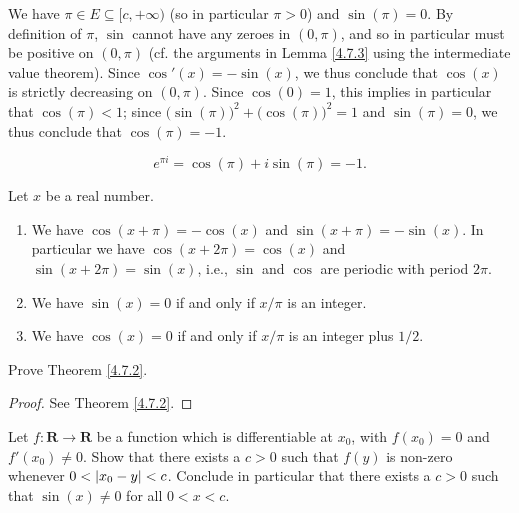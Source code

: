 \begin{additional corollary}\label{ac 4.7.2}
We have \(\pi \in E \subseteq [c, +\infty)\) (so in particular \(\pi > 0\)) and \(\sin(\pi) = 0\).
By definition of \(\pi\), \(\sin\) cannot have any zeroes in \((0, \pi)\), and so in particular must be positive on \((0, \pi)\)
(cf. the arguments in Lemma \ref{4.7.3} using the intermediate value theorem).
Since \(\cos'(x) = -\sin(x)\), we thus conclude that \(\cos(x)\) is strictly decreasing on \((0, \pi)\).
Since \(\cos(0) = 1\), this implies in particular that \(\cos(\pi) < 1\);
since \(\big(\sin(\pi)\big)^2 + \big(\cos(\pi)\big)^2 = 1\) and \(\sin(\pi) = 0\), we thus conclude that \(\cos(\pi) = -1\).
\end{additional corollary}

\begin{additional corollary}\label{ac 4.7.3}
\[
    e^{\pi i} = \cos(\pi) + i \sin(\pi) = -1.
\]
\end{additional corollary}

\begin{theorem}\label{4.7.5}
    Let \(x\) be a real number.
    \begin{enumerate}
        \item We have \(\cos(x + \pi) = -\cos(x)\) and \(\sin(x + \pi) = -\sin(x)\).
              In particular we have \(\cos(x + 2\pi) = \cos(x)\) and \(\sin(x + 2\pi) = \sin(x)\), i.e., \(\sin\) and \(\cos\) are periodic with period \(2\pi\).
        \item We have \(\sin(x) = 0\) if and only if \(x / \pi\) is an integer.
        \item We have \(\cos(x) = 0\) if and only if \(x / \pi\) is an integer plus \(1 / 2\).
    \end{enumerate}
\end{theorem}

\exercisesection

\begin{exercise}\label{ex 4.7.1}
    Prove Theorem \ref{4.7.2}.
\end{exercise}

\begin{proof}
    See Theorem \ref{4.7.2}.
\end{proof}

\begin{exercise}\label{ex 4.7.2}
    Let \(f : \mathbf{R} \to \mathbf{R}\) be a function which is differentiable at \(x_0\), with \(f(x_0) = 0\) and \(f'(x_0) \neq 0\).
    Show that there exists a \(c > 0\) such that \(f(y)\) is non-zero whenever \(0 < \abs*{x_0 - y} < c\).
    Conclude in particular that there exists a \(c > 0\) such that \(\sin(x) \neq 0\) for all \(0 < x < c\).
\end{exercise}

